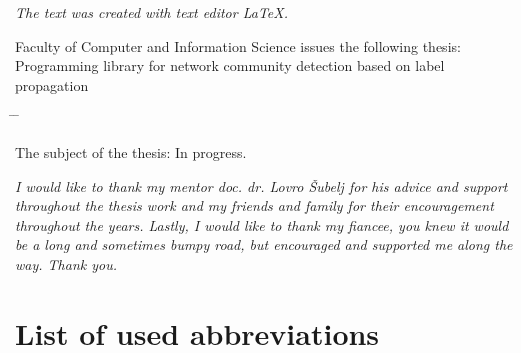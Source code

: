 \documentclass[a4paper, 12pt]{book}
\newcommand{\clearemptydoublepage}{\newpage{\pagestyle{empty}\cleardoublepage}}
\begin{document}
\begin{center}
\mbox{}\vfill
\emph{The text was created with text editor \LaTeX.}
\end{center}
\clearemptydoublepage


\noindent
Faculty of Computer and Information Science issues the following thesis:
Programming library for network community detection based on label propagation
\medskip
\begin{tabbing}
\hspace{32mm}\= \hspace{6cm} \= \kill




The subject of the thesis:
In progress.
\end{tabbing}
\vspace{15mm}






\vspace{2cm}

\clearemptydoublepage

\thispagestyle{empty}\mbox{}\vfill\null\it%
\noindent
I would like to thank my mentor doc. dr. Lovro Šubelj for his advice and support throughout the thesis work and my friends and family for their encouragement throughout the years. Lastly, I would like to thank my fiancee, you knew it would be a long and sometimes bumpy road, but encouraged and supported me along the way. Thank you.
\rm\normalfont

\clearemptydoublepage


\pagestyle{empty}
\def\thepage{}%
\tableofcontents{}


\clearemptydoublepage


\chapter*{List of used abbreviations}  %

\begin{comment}
\begin{tabular}{l|l|l}
  {\bf Abbreviation} & {\bf English} & {\bf Slovenian} \\ \hline
  {\bf CA} & classification accuracy & klasifikacijska točnost \\
  {\bf DBMS} & database management system & sistem za upravljanje podatkovnih baz \\
  {\bf SVM} & support vector machine & metoda podpornih vektorjev \\
  \dots & \dots & \dots \\
\end{tabular}
\end{comment}
\end{document}
